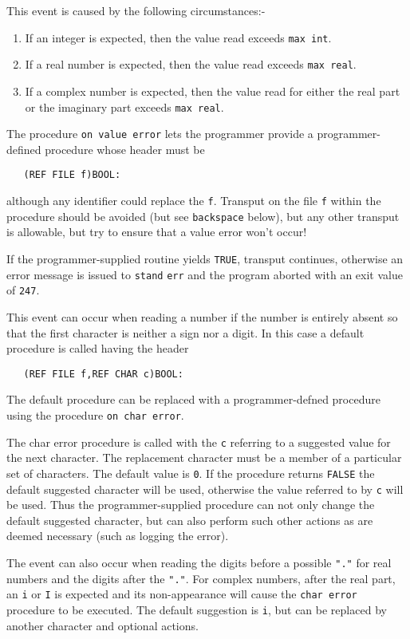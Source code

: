 This event is caused by the following circumstances:-
\begin{enumerate}
\item If an integer is expected, then the value read exceeds
\verb|max int|.
\item If a real number is expected, then the value read exceeds
\verb|max real|.
\item If a complex number is expected, then the value read for either
the real part or the imaginary part exceeds \verb|max real|.
\end{enumerate}
The procedure \verb|on value error| lets the programmer provide
a prog\-ram\-mer-def\-ined procedure whose header must be
\begin{verbatim}
   (REF FILE f)BOOL:
\end{verbatim}
\noindent
although any identifier could replace the \verb|f|. Transput on the
file \verb|f| within the procedure should be avoided (but see
\verb|backspace| below), but any other transput is allowable, but try
to ensure that a value error won't occur!

If the programmer-supplied routine yields \verb|TRUE|, transput
continues, otherwise an error message is issued to \verb|stand|
\verb|err| and the program aborted with an exit value of \verb|247|.

This event can occur when reading a number if the number is entirely
absent so that the first character is neither a sign nor a digit. In
this case a default procedure is called having the header
\begin{verbatim}
   (REF FILE f,REF CHAR c)BOOL:
\end{verbatim}
\noindent
The default procedure can be replaced with a prog\-ram\-mer-def\-ned
procedure using the procedure \verb|on char error|.

The char error procedure is called with the \verb|c| referring to a
suggested value for the next character. The replacement character
must be a member of a particular set of characters. The default value
is \verb|0|. If the procedure returns \verb|FALSE| the default
suggested character will be used, otherwise the value referred to by
\verb|c| will be used. Thus the programmer-supplied procedure can not
only change the default suggested character, but can also perform
such other actions as are deemed necessary (such as logging the
error).

The event can also occur when reading the digits before a possible
\verb|"."| for real numbers and the digits after the \verb|"."|. For
complex numbers, after the real part, an \verb|i| or \verb|I| is
expected and its non-appearance will cause the \verb|char error|
procedure to be executed. The default suggestion is \verb|i|, but can
be replaced by another character and optional actions.

